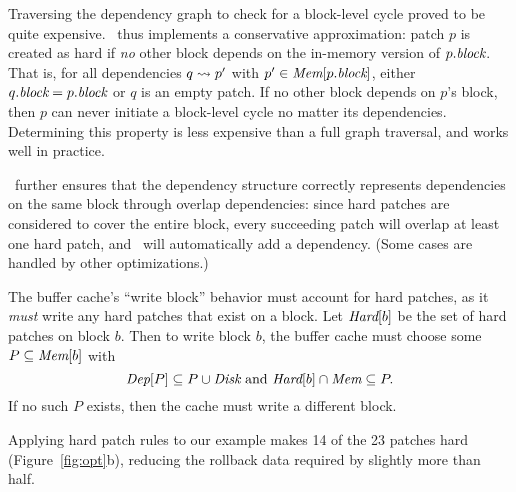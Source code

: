 Traversing the dependency graph to check for a block-level cycle
proved to be quite expensive.
%
\Kudos\ thus implements a conservative approximation: patch $p$ is
created as hard if \emph{no} other block depends on the in-memory
version of $p.\textit{block}$.
%
That is, for all dependencies $q \leadsto p'$ with $p' \in
\PMem[\PBlock{p}]$, either $q.\textit{block} = p.\textit{block}$ or $q$ is an empty
patch.
%
If no other block depends on $p$'s block, then $p$ can never initiate a
block-level cycle no matter its dependencies.
%
Determining this property is less expensive than a full graph
traversal, and works well in practice.


\Kudos\ further ensures that the dependency structure correctly
represents dependencies on the same block through overlap
dependencies: since hard patches are considered to cover the entire
block, every succeeding patch will overlap at least one hard patch,
and \Kudos\ will automatically add a dependency.
%
(Some cases are handled by other optimizations.)


The buffer cache's ``write block'' behavior must account for hard
patches, as it \emph{must} write any hard patches that exist on a
block.
%
Let $\PHard[b]$ be the set of hard patches on block $b$.
%
Then to write block $b$, the buffer cache must choose some $P \subseteq
\PMem[b]$ with
%
\[ \PDepset{P} \subseteq P \cup \PDisk \text{ and } \PHard[b] \cap \PMem
\subseteq P. \]
%
If no such $P$ exists, then the cache must write a different block.


Applying hard patch rules to our example makes 14 of the 23 patches hard
(Figure~\ref{fig:opt}b),
%
reducing the rollback data required by slightly more than half.



